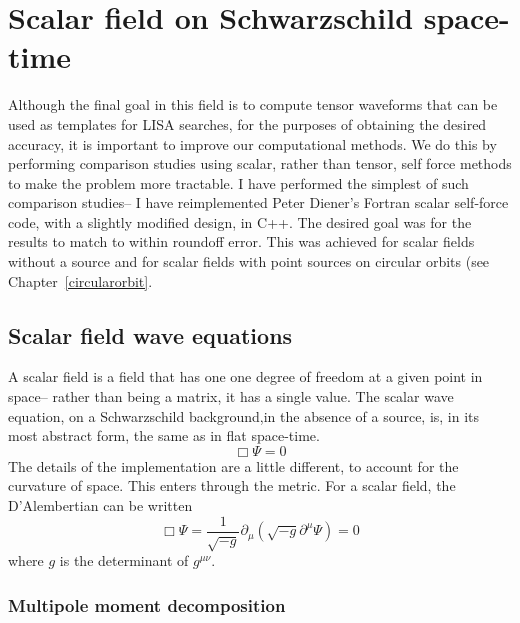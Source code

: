 \section{Scalar field on Schwarzschild space-time}
Although the final goal in this field is to compute tensor waveforms that can be used as templates for LISA searches, for the purposes of obtaining the desired accuracy, it is important to improve our computational methods. We do this by performing comparison studies using scalar, rather than tensor, self force methods to make the problem more tractable. I have performed the simplest of such comparison studies-- I have reimplemented Peter Diener's Fortran scalar self-force code, with a slightly modified design, in C++. The desired goal was for the results to match to within roundoff error. This was achieved for scalar fields without a source and for scalar fields with point sources on circular orbits (see Chapter~\ref{circularorbit}.


\subsection{Scalar field wave equations}
A scalar field is a field that has one one degree of freedom at a given point in space-- rather than being a matrix, it has a single value. The scalar wave equation, on a Schwarzschild background,in the absence of a source, is, in its most abstract form, the same as in flat space-time. 
\begin{equation}
  \Box\Psi=0
\end{equation}
The details of the implementation are a little different, to account for the curvature of space. This enters through the metric. For a scalar field, the D'Alembertian can be written
\begin{equation}
  \Box\Psi=\frac{1}{\sqrt{-g}}\partial_\mu(\sqrt{-g}\partial^\mu\Psi)=0
\end{equation}
where $g$ is the determinant of $g^{\mu\nu}$.~\cite{Wald} 

\subsubsection{Multipole moment decomposition}

